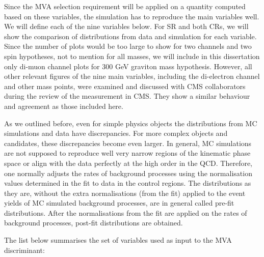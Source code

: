 Since the MVA selection requirement will be applied on a quantity computed based on these variables, the simulation has to  reproduce the main variables well. We will define each of the nine variables below. For SR and both CRs, we will show the comparison of distributions from data and simulation for each variable. Since the number of plots would be too large to show for two channels and two spin hypotheses, not to mention for all masses, we will include in this dissertation only di-muon channel plots for 300 GeV graviton mass hypothesis. However, all other relevant figures of the nine main variables, including the di-electron channel and other mass points,  were examined and discussed with CMS collaborators during the review of the measurement in CMS. They show a similar behaviour and agreement as those included here.
           
As we outlined before, even for simple physics objects the distributions from MC simulations and data have discrepancies. For more complex objects and candidates, these discrepancies become even larger. In general, MC simulations are not supposed to reproduce well very narrow regions of the kinematic phase space or align with the data perfectly at the high order in the QCD. Therefore, one normally adjusts the rates of background processes using the normalisation values determined in the fit to data in the control regions. The distributions as they are, without the extra normalisations (from the fit) applied to the event yields of MC simulated background processes, are in general called pre-fit distributions. After the normalisations from the fit are applied on the rates of background processes, post-fit distributions are obtained. 
           
           
The list below summarises the set of variables used as input to the MVA discriminant:

